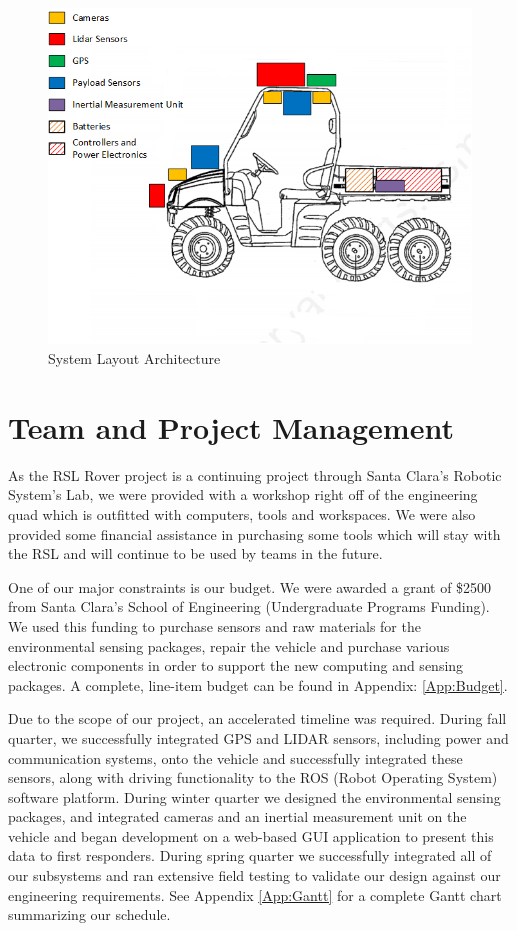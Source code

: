 \begin{figure}[H]
\centering
\includegraphics[width=.7\linewidth]{SensorLayout}
\caption{System Layout Architecture}
\label{fig:systemlayout}
\end{figure}
%
\section{Team and Project Management}

As the RSL Rover project is a continuing project through Santa Clara's Robotic System's Lab, we were provided with a workshop right off of the engineering quad which is outfitted with computers, tools and workspaces. We were also provided some financial assistance in purchasing some tools which will stay with the RSL and will continue to be used by teams in the future. 

One of our major constraints is our budget. We were awarded a grant of \$2500 from Santa Clara's School of Engineering (Undergraduate Programs Funding). We used this funding to purchase sensors and raw materials for the environmental sensing packages, repair the vehicle and purchase various electronic components in order to support the new computing and sensing packages. A complete, line-item budget can be found in Appendix: \ref{App:Budget}. 

Due to the scope of our project, an accelerated timeline was required. During fall quarter, we successfully integrated GPS and LIDAR sensors, including power and communication systems, onto the vehicle and successfully integrated these sensors, along with driving functionality to the ROS (Robot Operating System) software platform. During winter quarter we designed the environmental sensing packages, and integrated cameras and an inertial measurement unit on the vehicle and began development on a web-based GUI application to present this data to first responders. During spring quarter we successfully integrated all of our subsystems and ran extensive field testing to validate our design against our engineering requirements. See Appendix \ref{App:Gantt} for a complete Gantt chart summarizing our schedule. 

